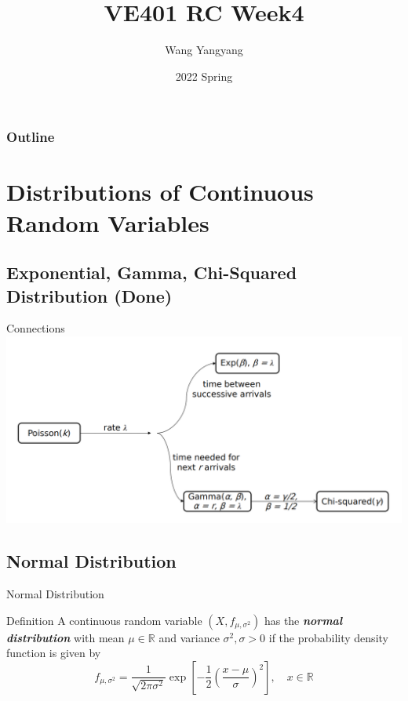 \documentclass{beamer}
\title{VE401 RC Week4}
\author{Wang Yangyang}
\date{2022 Spring}
\institute{UM-SJTU JI}
\newcommand{\bb}[1]{\textcolor{antiquefuchsia}{\textbf{\textit{#1}}}}
\begin{document}
\maketitle

\begin{frame}
\frametitle{Outline}
\tableofcontents
\end{frame}



\section{Distributions of Continuous Random Variables}
\subsection{Exponential, Gamma, Chi-Squared Distribution (Done)}
\begin{frame}{Connections}
\includegraphics[scale=0.35]{connection.png}
\end{frame}

\subsection{Normal Distribution}
\begin{frame}{Normal Distribution}
\begin{block}{Definition}
A continuous random variable $\left(X, f_{\mu, \sigma^{2}}\right)$ has the \bb{normal distribution} with mean $\mu \in \mathbb{R}$ and variance $\sigma^{2}, \sigma>0$ if the probability density function is given by
$$
f_{\mu, \sigma^{2}}=\frac{1}{\sqrt{2 \pi \sigma^{2}}} \exp \left[-\frac{1}{2}\left(\frac{x-\mu}{\sigma}\right)^{2}\right], \quad x \in \mathbb{R}
$$
\end{block}
\end{frame}
\end{document}
